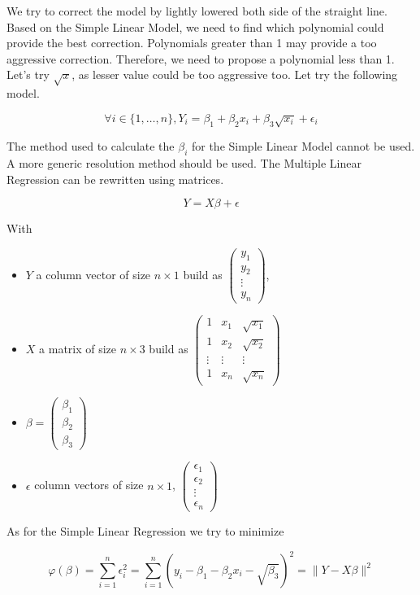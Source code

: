 \documentclass[
	12pt, %
]{article}
\theoremstyle{definition}
\begin{document}
\medskip
We try to correct the model by lightly lowered both side of the straight line. Based on the Simple Linear Model, we need to find which polynomial could provide the best correction. Polynomials greater than 1 may provide a too aggressive correction. Therefore, we need to propose a polynomial less than 1. Let's try $\sqrt{x}$, as lesser value could be too aggressive too. Let try the following model. 

$$
\forall i \in \{1,\dots,n\}, Y_i = \beta_1 + \beta_2x_i + \beta_3\sqrt{x_i} + \epsilon_i
$$

The method used to calculate the $\beta_i$ for the Simple Linear Model cannot be used. A more generic resolution method should be used. The Multiple Linear Regression can be rewritten using matrices. 

$$
Y = X\beta + \epsilon
$$

With 
\begin{itemize}
    \item $Y$ a column vector of size $n \times 1$ build as $\begin{pmatrix} y_1 \\ y_2 \\ \vdots \\ y_n \end{pmatrix}$, 
    \item $X$ a matrix of size $n \times 3$ build as $\begin{pmatrix} 1 & x_1 & \sqrt{x_1} \\ 1 & x_2 & \sqrt{x_2}  \\ \vdots & \vdots & \vdots \\ 1 & x_n & \sqrt{x_n}  \end{pmatrix}$ 
    \item $\beta = \begin{pmatrix} \beta_1 \\ \beta_2 \\ \beta_3 \end{pmatrix}$
    \item $\epsilon$ column vectors of size $n \times 1$, $\begin{pmatrix} \epsilon_1 \\ \epsilon_2 \\ \vdots \\ \epsilon_n \end{pmatrix}$
\end{itemize}

As for the Simple Linear Regression we try to minimize

$$
\varphi(\beta) = \sum_{i=1}^{n}{\epsilon_i^2} = \sum_{i=1}^{n}{(y_i - \beta_1 - \beta_2x_i - \sqrt{\beta_3})^2} = \lVert Y - X\beta \rVert^2
$$
\end{document}
